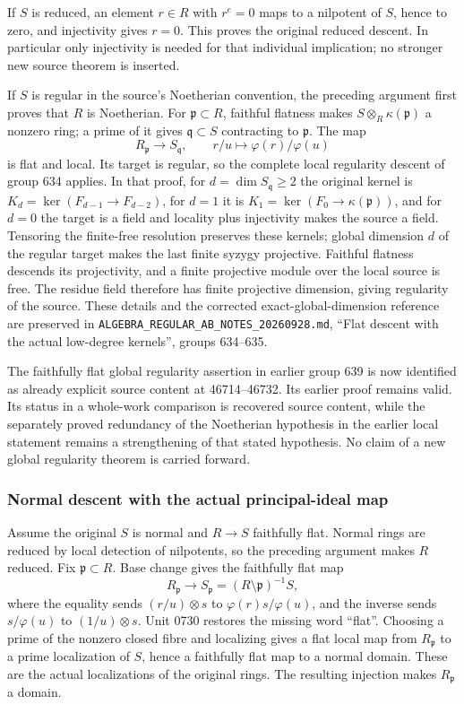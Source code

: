 If \(S\) is reduced, an element \(r\in R\) with \(r^e=0\) maps to a nilpotent of \(S\), hence to zero, and injectivity gives \(r=0\). This proves the original reduced descent. In particular only injectivity is needed for that individual implication; no stronger new source theorem is inserted.

If \(S\) is regular in the source's Noetherian convention, the preceding argument first proves that \(R\) is Noetherian. For \(\mathfrak p\subset R\), faithful flatness makes \(S\otimes_R\kappa(\mathfrak p)\) a nonzero ring; a prime of it gives \(\mathfrak q\subset S\) contracting to \(\mathfrak p\). The map \[
 R_{\mathfrak p}\longrightarrow S_{\mathfrak q},\qquad
 r/u\longmapsto\varphi(r)/\varphi(u)
\] is flat and local. Its target is regular, so the complete local regularity descent of group 634 applies. In that proof, for \(d=\dim S_{\mathfrak q}\ge2\) the original kernel is \(K_d=\ker(F_{d-1}\to F_{d-2})\), for \(d=1\) it is \(K_1=\ker(F_0\to\kappa(\mathfrak p))\), and for \(d=0\) the target is a field and locality plus injectivity makes the source a field. Tensoring the finite-free resolution preserves these kernels; global dimension \(d\) of the regular target makes the last finite syzygy projective. Faithful flatness descends its projectivity, and a finite projective module over the local source is free. The residue field therefore has finite projective dimension, giving regularity of the source. These details and the corrected exact-global-dimension reference are preserved in \texttt{ALGEBRA\_REGULAR\_AB\_NOTES\_20260928.md}, ``Flat descent with the actual low-degree kernels'', groups 634--635.

The faithfully flat global regularity assertion in earlier group 639 is now identified as already explicit source content at 46714--46732. Its earlier proof remains valid. Its status in a whole-work comparison is recovered source content, while the separately proved redundancy of the Noetherian hypothesis in the earlier local statement remains a strengthening of that stated hypothesis. No claim of a new global regularity theorem is carried forward.

\subsubsection{Normal descent with the actual principal-ideal map}\label{normal-descent-with-the-actual-principal-ideal-map}

Assume the original \(S\) is normal and \(R\to S\) faithfully flat. Normal rings are reduced by local detection of nilpotents, so the preceding argument makes \(R\) reduced. Fix \(\mathfrak p\subset R\). Base change gives the faithfully flat map \[
 R_{\mathfrak p}\longrightarrow S_{\mathfrak p}
 =(R\setminus\mathfrak p)^{-1}S,
\] where the equality sends \((r/u)\otimes s\) to \(\varphi(r)s/\varphi(u)\), and the inverse sends \(s/\varphi(u)\) to \((1/u)\otimes s\). Unit 0730 restores the missing word ``flat''. Choosing a prime of the nonzero closed fibre and localizing gives a flat local map from \(R_{\mathfrak p}\) to a prime localization of \(S\), hence a faithfully flat map to a normal domain. These are the actual localizations of the original rings. The resulting injection makes \(R_{\mathfrak p}\) a domain.

